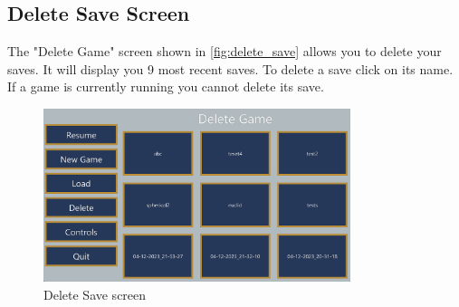 \subsection{Delete Save Screen}
The "Delete Game" screen shown in \autoref{fig:delete_save} allows you to delete your saves.
It will display you 9 most recent saves.
To delete a save click on its name.
If a game is currently running you cannot delete its save.

\begin{figure}[H]
    \centering
    \includegraphics[width=0.8\textwidth]{sections/user_manual/resources/delete-game.png}
    \caption{Delete Save screen}
    \label{fig:delete_save}
\end{figure}